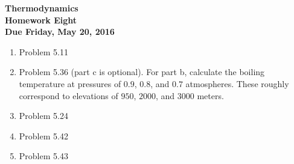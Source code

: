 \documentclass[12pt]{article}
\begin{document}
\pagestyle{empty}
 
\begin{center}
{\large {\bf Thermodynamics}}\\
\medskip
{\large {\bf Homework Eight}}\\
\medskip
{ {\bf Due Friday, May 20, 2016}}\\
\end{center}
\bigskip
\begin{enumerate}
 
  \item Problem 5.11
  \item Problem 5.36 (part c is optional).  For part b, calculate the
    boiling temperature at pressures of $0.9$, $0.8$, and $0.7$
    atmospheres.  These roughly correspond to elevations of $950$,
    $2000$, and $3000$ meters. 
  \item Problem 5.24
  \item Problem 5.42
  \item Problem 5.43

\end{enumerate}
\end{document}
